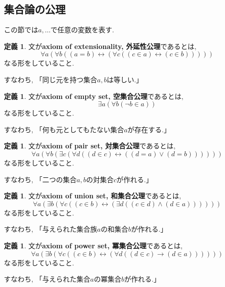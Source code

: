 \documentclass[a4paper, twoside]{bxjsarticle}
\theoremstyle{definition}
\newtheorem{defn}[thm]{定義}
\begin{document}
    \subsection{集合論の公理}
        この節では$a, \dots$で任意の変数を表す. 
        \begin{defn}
        文が\textbf{axiom of extensionality, 外延性公理}であるとは,
        \[\forall a (\forall b ((a=b)\leftrightarrow(\forall c ((c\in a)\leftrightarrow(c\in b)))))\]
        なる形をしていること.
        
        すなわち, 「同じ元を持つ集合$a, b$は等しい.」
        \end{defn}
        \begin{defn}
        文が\textbf{axiom of empty set, 空集合公理}であるとは,
        \[\exists a (\forall b (\lnot b \in a))\]
        なる形をしていること.
        
        すなわち, 「何も元としてもたない集合$a$が存在する.」
        \end{defn}
        \begin{defn}
        文が\textbf{axiom of pair set, 対集合公理}であるとは,
        \[\forall a (\forall b (\exists c (\forall d ((d \in c)\leftrightarrow((d=a)\lor(d=b))))))\]
        なる形をしていること.
        
        すなわち, 「二つの集合$a, b$の対集合$c$が作れる.」
        \end{defn}
        \begin{defn}
        文が\textbf{axiom of union set, 和集合公理}であるとは,
        \[\forall a (\exists b (\forall c ((c\in b)\leftrightarrow(\exists d ((c\in d)\land (d\in a))))))\]
        なる形をしていること.
        
        すなわち, 「与えられた集合族$a$の和集合$b$が作れる.」
        \end{defn}
        \begin{defn}
        文が\textbf{axiom of power set, 冪集合公理}であるとは,
        \[\forall a (\exists b (\forall c ((c\in b)\leftrightarrow(\forall d ((d\in c)\to (d\in a))))))\]
        なる形をしていること.
        
        すなわち, 「与えられた集合$a$の冪集合$b$が作れる.」
        \end{defn}
\end{document}
